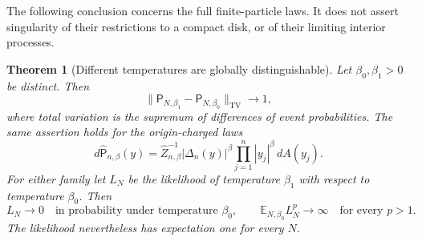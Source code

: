 \documentclass[11pt,a4paper]{article}
\numberwithin{equation}{section}
\newtheorem{theorem}{Theorem}[section]
\theoremstyle{definition}
\theoremstyle{remark}
\newcommand{\E}{\mathbb E}
\begin{document}
The following conclusion concerns the full finite-particle laws.  It
does not assert singularity of their restrictions to a compact disk,
or of their limiting interior processes.

\begin{theorem}[Different temperatures are globally distinguishable]
\label{thm:global-temperature-singularity}
Let $\beta_0,\beta_1>0$ be distinct.  Then
\begin{equation}
 \|\mathsf P_{N,\beta_1}-\mathsf P_{N,\beta_0}\|_{\mathrm{TV}}
 \longrightarrow1,
 \label{eq:global-temperature-tv}
\end{equation}
where total variation is the supremum of differences of event
probabilities.  The same assertion holds for the origin-charged laws
\[
 d\widehat{\mathsf P}_{n,\beta}(y)
 =\widehat Z_{n,\beta}^{-1}|\Delta_n(y)|^\beta
                  \prod_{j=1}^n|y_j|^\beta\,dA(y_j).
\]
For either family let $L_N$ be the likelihood of temperature
$\beta_1$ with respect to temperature $\beta_0$.  Then
\begin{equation}
 L_N\longrightarrow0\quad\text{in probability under temperature }
 \beta_0,
 \qquad
 \E_{N,\beta_0}L_N^p\longrightarrow\infty
 \quad\text{for every }p>1.
 \label{eq:global-temperature-likelihood}
\end{equation}
The likelihood nevertheless has expectation one for every $N$.
\end{theorem}
\end{document}
